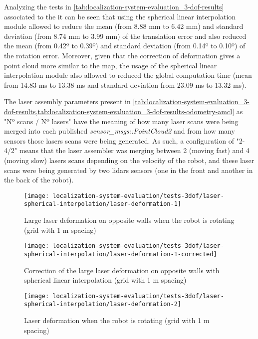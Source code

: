 Analyzing the tests in \cref{tab:localization-system-evaluation_3-dof-results} associated to the  it can be seen that using the spherical linear interpolation module allowed to reduce the mean (from 8.88 mm to 6.42 mm) and standard deviation (from 8.74 mm to 3.99 mm) of the translation error and also reduced the mean (from 0.42º to 0.39º) and standard deviation (from 0.14º to 0.10º) of the rotation error. Moreover, given that the correction of deformation gives a point cloud more similar to the map, the usage of the spherical linear interpolation module also allowed to reduced the global computation time (mean from 14.83 ms to 13.38 ms and standard deviation from 23.09 ms to 13.32 ms).

The laser assembly parameters present in \cref{tab:localization-system-evaluation_3-dof-results,tab:localization-system-evaluation_3-dof-results-odometry-amcl} as "Nº scans / Nº lasers" have the meaning of how many laser scans were being merged into each published \emph{sensor\_msgs::PointCloud2} and from how many sensors those lasers scans were being generated. As such, a configuration of "2-4/2" means that the laser assembler was merging between 2 (moving fast) and 4 (moving slow) lasers scans depending on the velocity of the robot, and these laser scans were being generated by two \glspl{lidar} sensors (one in the front and another in the back of the robot).


\begin{figure}[H]
	\centering
	\texttt{[image: localization-system-evaluation/tests-3dof/laser-spherical-interpolation/laser-deformation-1]}
	\caption{Large laser deformation on opposite walls when the robot is rotating (grid with 1 m spacing)}
	\label{fig:localization-system-evaluation_laser-deformation-1}
\end{figure}

\begin{figure}[H]
	\centering
	\texttt{[image: localization-system-evaluation/tests-3dof/laser-spherical-interpolation/laser-deformation-1-corrected]}
	\caption{Correction of the large laser deformation on opposite walls with spherical linear interpolation  (grid with 1 m spacing)}
	\label{fig:localization-system-evaluation_laser-deformation-1-corrected}
\end{figure}


\begin{figure}[H]
	\centering
	\texttt{[image: localization-system-evaluation/tests-3dof/laser-spherical-interpolation/laser-deformation-2]}
	\caption{Laser deformation when the robot is rotating  (grid with 1 m spacing)}
	\label{fig:localization-system-evaluation_laser-deformation-2}
\end{figure}

